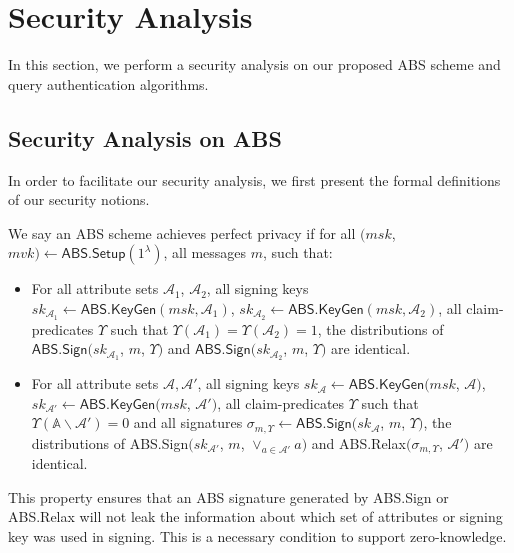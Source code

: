 \section{Security Analysis}\label{sec:access-control:security-analysis}

In this section, we perform a security analysis on our proposed ABS scheme and query authentication algorithms.

\subsection{Security Analysis on ABS}\label{sec:access-control:security-analysis-abs}

In order to facilitate our security analysis, we first present the formal definitions of our security notions.

\begin{definition}\label{def:access-control:abs-privacy}
  We say an ABS scheme achieves perfect privacy if for all $(msk$, $mvk) \gets \textsf{ABS.Setup}(1^\lambda)$, all messages $m$, such that:
  \begin{itemize}
    \item For all attribute sets $\mathcal{A}_1$, $\mathcal{A}_2$, all signing keys ${sk}_{\mathcal{A}_1} \gets \textsf{ABS.KeyGen}(msk, \mathcal{A}_1)$,  ${sk}_{\mathcal{A}_2} \gets \textsf{ABS.KeyGen}(msk, \mathcal{A}_2)$, all claim-predicates $\Upsilon$ such that $\Upsilon(\mathcal{A}_1)=\Upsilon(\mathcal{A}_2)=1$, the distributions of $\textsf{ABS.Sign}({sk}_{\mathcal{A}_1}$, $m$, $\Upsilon)$ and $\textsf{ABS.Sign}({sk}_{\mathcal{A}_2}$, $m$, $\Upsilon)$ are identical.
    \item For all attribute sets $\mathcal{A}, \mathcal{A}'$, all signing keys ${sk}_{\mathcal{A}} \gets \textsf{ABS.KeyGen}(msk$, $\mathcal{A})$,  ${sk}_{\mathcal{A}'} \gets \textsf{ABS.KeyGen}(msk$, $\mathcal{A}')$, all claim-predicates $\Upsilon$ such that $\Upsilon(\mathbb{A}\backslash\mathcal{A}') = 0$ and all signatures $\sigma_{m, \Upsilon} \gets \textsf{ABS.Sign}({sk}_{\mathcal{A}}$, $m$, $\Upsilon)$,  the distributions of \textsf{ABS.Sign}$(sk_{\mathcal{A}'}$, $m$, $\lor_{a \in \mathcal{A}'} a)$ and \textsf{ABS.Relax}$(\sigma_{m, \Upsilon}$, $\mathcal{A}')$ are identical.
  \end{itemize}
\end{definition}
This property ensures that an ABS signature generated by \textsf{ABS.Sign} or \textsf{ABS.Relax} will not leak the information about which set of attributes or signing key was used in signing. This is a necessary condition to support zero-knowledge.

